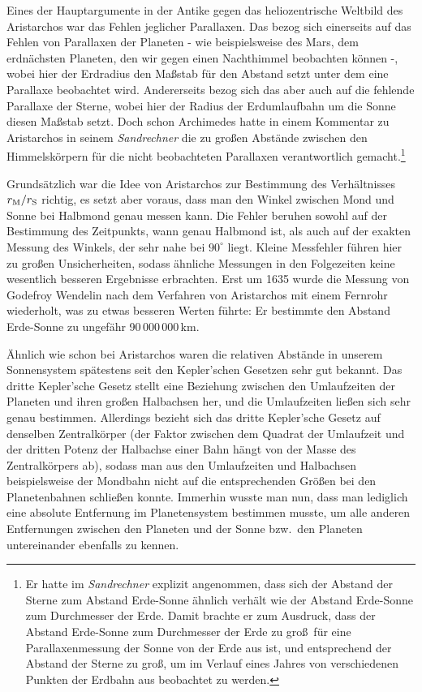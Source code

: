 Eines der Hauptargumente in der Antike gegen das heliozentrische Weltbild des Aristarchos war 
das Fehlen jeglicher Parallaxen. Das bezog sich einerseits auf das Fehlen von Parallaxen der 
Planeten - wie beispielsweise des Mars, dem erdn\"achsten Planeten, den wir gegen einen Nachthimmel 
beobachten k\"onnen -, wobei hier der Erdradius den Ma\ss stab f\"ur den Abstand setzt
unter dem eine Parallaxe beobachtet wird. Andererseits bezog sich das aber auch auf die 
fehlende Parallaxe der Sterne,
wobei hier der Radius der Erdumlaufbahn um die Sonne diesen Ma\ss stab setzt. Doch schon
Archimedes hatte in einem Kommentar zu Aristarchos in seinem 
\textit{Sandrechner} die
zu gro\ss en Abst\"ande zwischen den Himmelsk\"orpern f\"ur die nicht beobachteten Parallaxen 
verantwortlich gemacht.\footnote{Er hatte im \textit{Sandrechner}
explizit angenommen, dass sich der Abstand der Sterne zum Abstand Erde-Sonne \"ahnlich verh\"alt
wie der Abstand Erde-Sonne zum Durchmesser der Erde. Damit brachte er zum Ausdruck, dass
der Abstand Erde-Sonne zum Durchmesser der Erde zu gro\ss\ f\"ur eine Parallaxenmessung
der Sonne von der Erde aus ist, und entsprechend der Abstand der Sterne zu gro\ss, um
im Verlauf eines Jahres von verschiedenen Punkten der Erdbahn aus beobachtet zu werden.}  

Grunds\"atzlich war die Idee von Aristarchos zur Bestimmung des Verh\"altnisses $r_{\rm M}/r_{\rm S}$
richtig, es setzt aber voraus, dass man den Winkel zwischen Mond und Sonne bei
Halbmond genau messen kann. Die Fehler beruhen sowohl auf der Bestimmung
des Zeitpunkts, wann genau Halbmond ist, als auch auf der exakten Messung des Winkels, der sehr 
nahe bei $90^\circ$ liegt. Kleine Messfehler f\"uhren hier zu gro\ss en Unsicherheiten, sodass
\"ahnliche Messungen in den Folgezeiten keine wesentlich besseren Ergebnisse erbrachten.
Erst um 1635 wurde die Messung von Godefroy Wendelin nach dem Verfahren von Aristarchos
mit einem Fernrohr wiederholt, was zu 
etwas besseren Werten f\"uhrte: Er bestimmte den Abstand Erde-Sonne zu ungef\"ahr 90\,000\,000\,km.

\"Ahnlich wie schon bei Aristarchos waren die relativen Abst\"ande in unserem Sonnensystem
sp\"atestens seit den Kepler'schen Gesetzen sehr gut bekannt. Das dritte Kepler'sche 
Gesetz 
stellt eine Beziehung zwischen den Umlaufzeiten der Planeten und ihren
gro\ss en Halbachsen her, und die Umlaufzeiten lie\ss en sich sehr genau bestimmen. 
Allerdings bezieht sich das dritte Kepler'sche Gesetz auf denselben Zentralk\"orper 
(der Faktor zwischen dem Quadrat der Umlaufzeit und der dritten Potenz der Halbachse
einer Bahn h\"angt von der Masse des Zentralk\"orpers ab), sodass man aus den 
Umlaufzeiten und Halbachsen beispielsweise der Mondbahn nicht auf die entsprechenden
Gr\"o\ss en bei den Planetenbahnen schlie\ss en konnte. Immerhin wusste man nun, dass
man lediglich eine absolute Entfernung im Planetensystem bestimmen musste, um alle
anderen Entfernungen zwischen den Planeten und der Sonne bzw.\ den Planeten
untereinander ebenfalls zu kennen. 


